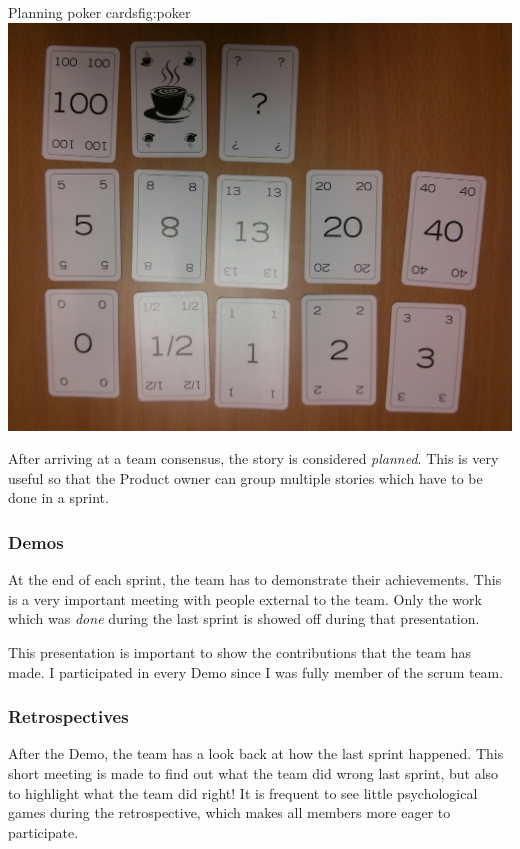 \begin{figureGraphics}{Planning poker cards}{fig:poker}
\includegraphics[width=\textwidth]{./src/img/poker.jpg}
\end{figureGraphics}

After arriving at a team consensus, the story is considered \emph{planned}. This
is very useful so that the Product owner can group multiple stories which have
to be done in a sprint.


\subsubsection{Demos}
At the end of each sprint, the team has to demonstrate their achievements. This
is a very important meeting with people external to the team. Only the work
which was \emph{done} during the last sprint is showed off during that presentation.

This presentation is important to show the contributions that the team has made.
I participated in every Demo since I was fully member of the scrum team.

\subsubsection{Retrospectives}
After the Demo, the team has a look back at how the last sprint happened. This short meeting is made
to find out what the team did wrong last sprint, but also to highlight what the team did right!
It is frequent to see little psychological games during the retrospective, which makes all members more
eager to participate.

